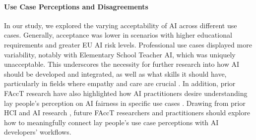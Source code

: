 
\paragraph{Use Case Perceptions and Disagreements}
In our study, we explored the varying acceptability of AI across different use cases. Generally, acceptance was lower in scenarios with higher educational requirements and greater EU AI risk levels. Professional use cases displayed more variability, notably with Elementary School Teacher AI, which was uniquely unacceptable. This underscores the necessity for further research into how AI should be developed and integrated, as well as what skills it should have, particularly in fields where empathy and care are crucial \citep{wu2024care,kawakami2024ai,borg2024required}. In addition, prior FAccT research have also highlighted how AI practitioners desire understanding lay people's perception on AI fairness in specific use cases \citep{sonboli2021fairness, deng2022exploring, smith2023scoping, deng2023understanding}. Drawing from prior HCI and AI research \citep{deng2025weaudit, lee2019webuildai, cheng2019explaining}, future FAccT researchers and practitioners should explore how to meaningfully connect lay people's use case perceptions with AI developers' workflows. 

